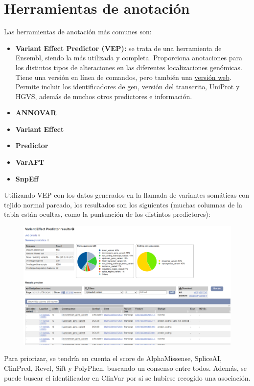 \section{Herramientas de anotación}
Las herramientas de anotación más comunes son:
\begin{itemize}
\item \textbf{Variant Effect Predictor (VEP):} se trata de una herramienta de Ensembl, siendo la más utilizada y completa. Proporciona anotaciones para los distintos tipos de alteraciones en las diferentes localizaciones genómicas. Tiene una versión en línea de comandos, pero también una \href{https://www.ensembl.org/info/docs/tools/vep/index.html}{versión web}. Permite incluir los identificadores de gen, versión del transcrito, UniProt y HGVS, además de muchos otros predictores e información. 
\item \textbf{ANNOVAR}
\item \textbf{Variant Effect}
\item \textbf{Predictor}
\item \textbf{VarAFT}
\item \textbf{SnpEff}
\end{itemize}

Utilizando VEP con los datos generados en la llamada de variantes somáticas con tejido normal pareado, los resultados son los siguientes (muchas columnas de la tabla están ocultas, como la puntuación de los distintos predictores):
\begin{figure}[htbp]
\centering
\includegraphics[width = \textwidth]{figs/vep-result.png}
\end{figure}

Para priorizar, se tendría en cuenta el score de AlphaMissense, SpliceAI, ClinPred, Revel, Sift y PolyPhen, buscando un consenso entre todos. Además, se puede buscar el identificador en ClinVar por si se hubiese recogido una asociación.

